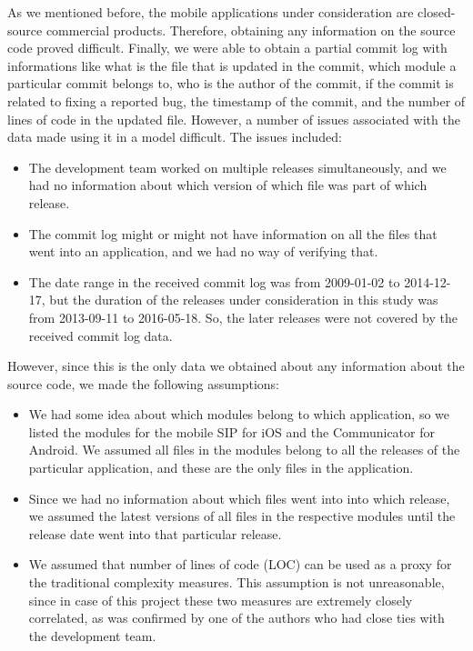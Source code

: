 \documentclass[smallcondensed]{svjour3}     %
\begin{document}
As we mentioned before, the mobile applications under consideration are closed-source commercial products. Therefore, obtaining any information on the source code proved difficult. Finally, we were able to obtain a partial commit log with informations like what is the file that is updated in the commit, which module a particular commit belongs to, who is the author of the commit, if the commit is related to fixing a reported bug, the timestamp of the commit, and the number of lines of code in the updated file. However, a number of issues associated with the data made using it in a model difficult. The issues included:
\begin{itemize}
\item The development team worked on multiple releases simultaneously, and we had no information about which version of which file was part of which release.
\item The commit log might or might not have information on all the files that went into an application, and we had no way of verifying that.
\item The date range in the received commit log was from 2009-01-02 to 2014-12-17, but the duration of the releases under consideration in this study was from 2013-09-11 to 2016-05-18. So, the later releases were not covered by the received commit log data.
\end{itemize}

However, since this is the only data we obtained about any information about the source code, we made the following assumptions:

\begin{itemize}
\item We had some idea about which modules belong to which application, so we listed the modules for the mobile SIP for iOS and the Communicator for Android. We assumed all files in the modules belong to all the releases of the particular application, and these are the only files in the application.
\item Since we had no information about which files went into into which release, we assumed the latest versions of all files in the respective modules until the release date went into that particular release.
\item We assumed that number of lines of code (LOC) can be used as a proxy for the traditional complexity measures. This assumption is not unreasonable, since in case of this project these two measures are extremely closely correlated, as was confirmed by one of the authors who had close ties with the development team.
\end{itemize}
\end{document}
